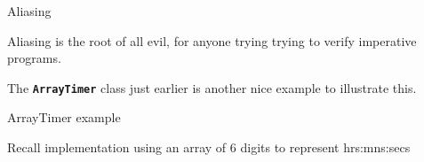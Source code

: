 \documentclass[
pdf,
nocolorBG,
slideColor,
erik,
]{prosper}
\newcommand{\code}[1]{{\rm \texttt{\textbf{\small #1}}}}
\begin{document}
\begin{slide}{Aliasing}
\vspace*{-4ex}

Aliasing is the root of all evil, for anyone trying trying to verify 
imperative programs.

\medskip

The \code{ArrayTimer} class just earlier is another nice example
to illustrate this.

\end{slide}


\begin{slide}{ArrayTimer example}
\vspace*{-4ex}

Recall implementation using an array of 6 digits to represent
hrs:mns:secs


\end{slide}
\end{document}
